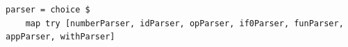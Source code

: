 \documentclass[format=acmlarge, review=false, nonacm=false, screen=true]{acmart}
\begin{document}
\begin{verbatim}
parser = choice $
    map try [numberParser, idParser, opParser, if0Parser, funParser, appParser, withParser]
\end{verbatim}

\end{document}
